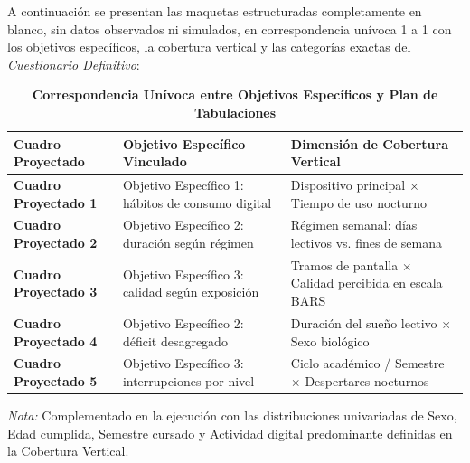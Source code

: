 \documentclass[12pt, letterpaper]{article}
\begin{document}
A continuación se presentan las maquetas estructuradas completamente en blanco, sin datos observados ni simulados, en correspondencia unívoca 1 a 1 con los objetivos específicos, la cobertura vertical y las categorías exactas del \textit{Cuestionario Definitivo}:

\begin{table}[H]
\centering
\begin{singlespace}
\caption*{\textbf{Correspondencia Unívoca entre Objetivos Específicos y Plan de Tabulaciones}}
\footnotesize
\setlength{\tabcolsep}{5pt}
\begin{tabularx}{\textwidth}{>{\raggedright\arraybackslash}p{3.2cm}>{\raggedright\arraybackslash}p{4.8cm}>{\raggedright\arraybackslash}X}
\toprule
\textbf{Cuadro Proyectado} & \textbf{Objetivo Específico Vinculado} & \textbf{Dimensión de Cobertura Vertical} \\
\midrule
\textbf{Cuadro Proyectado 1} & Objetivo Específico 1: hábitos de consumo digital & Dispositivo principal $\times$ Tiempo de uso nocturno \\
\textbf{Cuadro Proyectado 2} & Objetivo Específico 2: duración según régimen & Régimen semanal: días lectivos vs. fines de semana \\
\textbf{Cuadro Proyectado 3} & Objetivo Específico 3: calidad según exposición & Tramos de pantalla $\times$ Calidad percibida en escala BARS \\
\textbf{Cuadro Proyectado 4} & Objetivo Específico 2: déficit desagregado & Duración del sueño lectivo $\times$ Sexo biológico \\
\textbf{Cuadro Proyectado 5} & Objetivo Específico 3: interrupciones por nivel & Ciclo académico / Semestre $\times$ Despertares nocturnos \\
\bottomrule
\end{tabularx}
\par\smallskip\parbox{\textwidth}{\footnotesize\textit{Nota:} Complementado en la ejecución con las distribuciones univariadas de Sexo, Edad cumplida, Semestre cursado y Actividad digital predominante definidas en la Cobertura Vertical.}
\end{singlespace}
\end{table}
\end{document}

